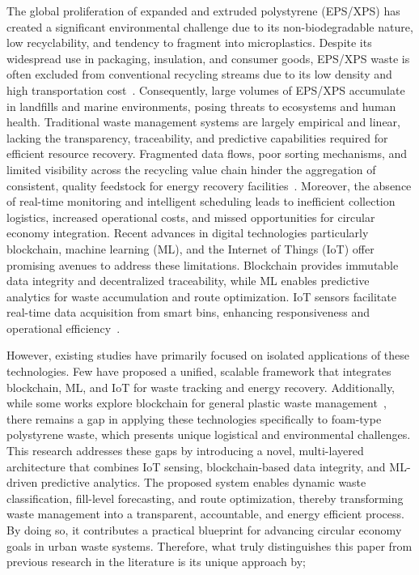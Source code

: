 \documentclass[final,5p,times,twocolumn]{elsarticle}
\begin{document}
The global proliferation of expanded and extruded polystyrene (EPS/XPS) has created a significant environmental challenge due to its non-biodegradable nature, low recyclability, and tendency to fragment into microplastics. Despite its widespread use in packaging, insulation, and consumer goods, EPS/XPS waste is often excluded from conventional recycling streams due to its low density and high transportation cost~\cite{ugwu2023mini}. Consequently, large volumes of EPS/XPS accumulate in landfills and marine environments, posing threats to ecosystems and human health. Traditional waste management systems are largely empirical and linear, lacking the transparency, traceability, and predictive capabilities required for efficient resource recovery. Fragmented data flows, poor sorting mechanisms, and limited visibility across the recycling value chain hinder the aggregation of consistent, quality feedstock for energy recovery facilities~\cite{gulyamov2024}. Moreover, the absence of real-time monitoring and intelligent scheduling leads to inefficient collection logistics, increased operational costs, and missed opportunities for circular economy integration. Recent advances in digital technologies particularly blockchain, machine learning (ML), and the Internet of Things (IoT) offer promising avenues to address these limitations. Blockchain provides immutable data integrity and decentralized traceability, while ML enables predictive analytics for waste accumulation and route optimization. IoT sensors facilitate real-time data acquisition from smart bins, enhancing responsiveness and operational efficiency~\cite{steenmans2021blockchain, bulkowska2023implementation}.

However, existing studies have primarily focused on isolated applications of these technologies. Few have proposed a unified, scalable framework that integrates blockchain, ML, and IoT for waste tracking and energy recovery. Additionally, while some works explore blockchain for general plastic waste management~\cite{mondal2022blockchain}, there remains a gap in applying these technologies specifically to foam-type polystyrene waste, which presents unique logistical and environmental challenges. This research addresses these gaps by introducing a novel, multi-layered architecture that combines IoT sensing, blockchain-based data integrity, and ML-driven predictive analytics. The proposed system enables dynamic waste classification, fill-level forecasting, and route optimization, thereby transforming waste management into a transparent, accountable, and energy efficient process. By doing so, it contributes a practical blueprint for advancing circular economy goals in urban waste systems. Therefore, what truly distinguishes this paper from previous research in the literature is its unique approach by;
\end{document}
